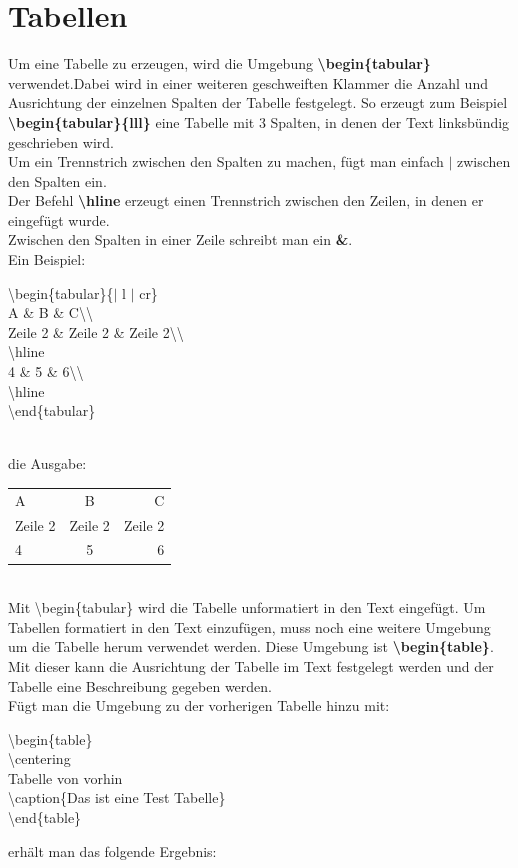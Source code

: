 \documentclass[a4paper, 12pt]{scrreprt}
\begin{document}
\section{Tabellen}
Um eine Tabelle zu erzeugen, wird die Umgebung \textbf{\textbackslash begin\{tabular\}} verwendet.Dabei wird in einer weiteren geschweiften Klammer die Anzahl und Ausrichtung der einzelnen Spalten der Tabelle festgelegt. So erzeugt zum Beispiel\\
\textbf{\textbackslash begin\{tabular\}\{lll\}} eine Tabelle mit 3 Spalten, in denen der Text linksbündig geschrieben wird.\\ Um ein Trennstrich zwischen den Spalten zu machen, fügt man einfach \textbf{$\mid$} zwischen den Spalten ein.\\
Der Befehl \textbf{\textbackslash hline} erzeugt einen Trennstrich zwischen den Zeilen, in denen er eingefügt wurde.\\
Zwischen den Spalten in einer Zeile schreibt man ein \textbf{\&}.\\
Ein Beispiel:\\
\begin{addmargin}{0.5cm}
\textbackslash begin\{tabular\}\{$\mid$ l $\mid$ cr\}\\
A \& B \& C\textbackslash\textbackslash\\
Zeile 2 \& Zeile 2 \& Zeile 2\textbackslash\textbackslash\\
\textbackslash hline\\
4 \& 5 \& 6\textbackslash\textbackslash\\ 
\textbackslash hline\\
\textbackslash end\{tabular\}
\end{addmargin}\hfill\\
die Ausgabe:\\
\begin{tabular}{|l|cr}
A & B & C\\
Zeile 2 & Zeile 2 & Zeile 2\\
\hline
4 & 5 & 6\\
\hline
\end{tabular}\hfill\\

\noindent Mit \textbackslash begin\{tabular\} wird die Tabelle unformatiert in den Text eingefügt. Um Tabellen formatiert in den Text einzufügen, muss noch eine weitere Umgebung um die Tabelle herum verwendet werden. Diese Umgebung ist \textbf{\textbackslash begin\{table\}}. Mit dieser kann die Ausrichtung der Tabelle im Text festgelegt werden und der Tabelle eine Beschreibung gegeben werden.\\
Fügt man die Umgebung zu der vorherigen Tabelle hinzu mit:\\
\begin{addmargin}{0.5cm}
\textbackslash begin\{table\}\\
\textbackslash centering\\
Tabelle von vorhin\\
\textbackslash caption\{Das ist eine Test Tabelle\}\\
\textbackslash end\{table\}\\
\end{addmargin}
erhält man das folgende Ergebnis:\\
\end{document}
